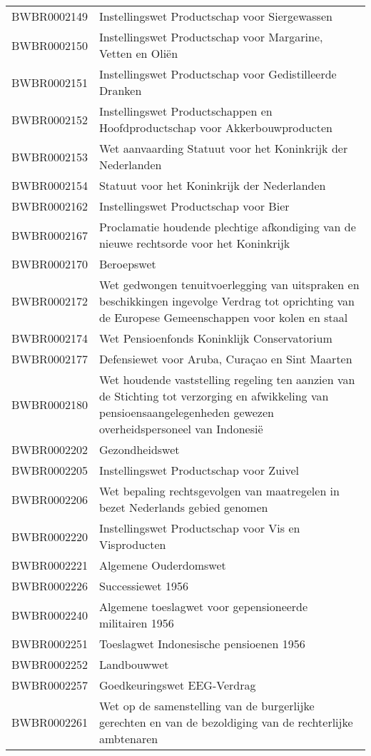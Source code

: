 \begin{longtable}{lp{}}
BWBR0002149 & Instellingswet Productschap voor Siergewassen \\
BWBR0002150 & Instellingswet Productschap voor Margarine, Vetten en Oliën \\
BWBR0002151 & Instellingswet Productschap voor Gedistilleerde Dranken \\
BWBR0002152 & Instellingswet Productschappen en Hoofdproductschap voor Akkerbouwproducten \\
BWBR0002153 & Wet aanvaarding Statuut voor het Koninkrijk der Nederlanden \\
BWBR0002154 & Statuut voor het Koninkrijk der Nederlanden \\
BWBR0002162 & Instellingswet Productschap voor Bier \\
BWBR0002167 & Proclamatie houdende plechtige afkondiging van de nieuwe rechtsorde voor het Koninkrijk \\
BWBR0002170 & Beroepswet \\
BWBR0002172 & Wet gedwongen tenuitvoerlegging van uitspraken en beschikkingen ingevolge Verdrag tot oprichting van de Europese Gemeenschappen voor kolen en staal \\
BWBR0002174 & Wet Pensioenfonds Koninklijk Conservatorium \\
BWBR0002177 & Defensiewet voor Aruba, Curaçao en Sint Maarten \\
BWBR0002180 & Wet houdende vaststelling regeling ten aanzien van de Stichting tot verzorging en afwikkeling van pensioensaangelegenheden gewezen overheidspersoneel van Indonesië \\
BWBR0002202 & Gezondheidswet \\
BWBR0002205 & Instellingswet Productschap voor Zuivel \\
BWBR0002206 & Wet bepaling rechtsgevolgen van maatregelen in bezet Nederlands gebied genomen \\
BWBR0002220 & Instellingswet Productschap voor Vis en Visproducten \\
BWBR0002221 & Algemene Ouderdomswet \\
BWBR0002226 & Successiewet 1956 \\
BWBR0002240 & Algemene toeslagwet voor gepensioneerde militairen 1956 \\
BWBR0002251 & Toeslagwet Indonesische pensioenen 1956 \\
BWBR0002252 & Landbouwwet \\
BWBR0002257 & Goedkeuringswet EEG-Verdrag \\
BWBR0002261 & Wet op de samenstelling van de burgerlijke gerechten en van de bezoldiging van de rechterlijke ambtenaren \\

\end{longtable}
